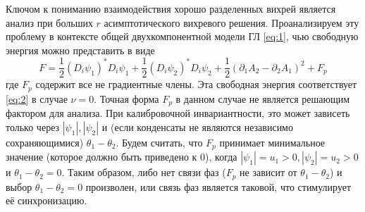 Ключом к пониманию взаимодействия хорошо разделенных вихрей является анализ 
при больших \( r \) асимптотического вихревого решения. Проанализируем эту 
проблему в контексте общей двухкомпонентной модели ГЛ \eqref{eq:1}, чью 
свободную энергия можно представить в виде
\begin{equation}
    F = \frac{1}{2}\left( D_i \psi_1 \right)^{*} D_i \psi_1 + 
        \frac{1}{2}\left( D_i \psi_2 \right)^{*} D_i \psi_2 + 
        \frac{1}{2}\left( \partial_1 A_2 - \partial_2 A_1 \right)^2 + F_p
    \label{eq:3}
\end{equation}
где \( F_p \) содержит все не градиентные члены. Эта свободная энергия 
соответствует \eqref{eq:2} в случае \( \nu = 0 \). Точная форма \( F_p \) в 
данном случае не является решающим фактором для анализа. При калибровочной 
инвариантности, это может зависеть только через \( |\psi_1|, |\psi_2| \) и 
(если конденсаты не являются независимо сохраняющимися) 
\( \theta_1 - \theta_2 \). Будем считать, что \( F_p \) принимает минимальное 
значение (которое должно быть приведено к 0), когда 
\( |\psi_1| = u_1 > 0, |\psi_2| = u_2 > 0 \) и \( \theta_1 - \theta_2 = 0 \).
Таким образом, либо нет связи фаз (\( F_p \) не зависит от 
\( \theta_1 - \theta_2 \)) и выбор \( \theta_1 - \theta_2 = 0 \) произволен, 
или связь фаз является таковой, что стимулирует её синхронизацию. 

